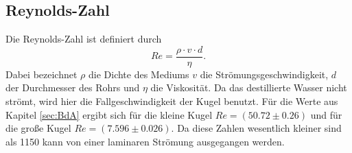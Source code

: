 \subsection{Reynolds-Zahl}
Die Reynolds-Zahl \cite{wiki} ist definiert durch
\begin{equation*}
  Re = \frac{\rho\cdot v\cdot d}{\eta}.
\end{equation*}
Dabei bezeichnet $\rho$ die Dichte des Mediums $v$ die Strömungsgeschwindigkeit,
$d$ der Durchmesser des Rohrs und $\eta$ die Viskosität.
Da das destillierte Wasser nicht
strömt, wird hier die Fallgeschwindigkeit der Kugel benutzt.
Für die Werte aus Kapitel \ref{sec:BdA} ergibt sich
für die kleine Kugel $Re = (50.72 \pm 0.26)$ und für die große Kugel
$ Re = (7.596 \pm 0.026) $. Da diese Zahlen wesentlich kleiner sind als
1150 kann von einer laminaren Strömung ausgegangen werden.




























%
